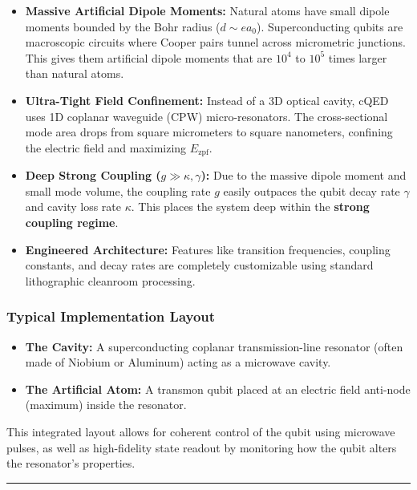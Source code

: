 \documentclass[
]{article}
\providecommand{\tightlist}{%
  \setlength{\itemsep}{0pt}\setlength{\parskip}{0pt}}
\begin{document}
\begin{itemize}
\tightlist
\item
  \textbf{Massive Artificial Dipole Moments:} Natural atoms have small
  dipole moments bounded by the Bohr radius (\(d \sim e a_0\)).
  Superconducting qubits are macroscopic circuits where Cooper pairs
  tunnel across micrometric junctions. This gives them artificial dipole
  moments that are \(10^4\) to \(10^5\) times larger than natural atoms.
\item
  \textbf{Ultra-Tight Field Confinement:} Instead of a 3D optical
  cavity, cQED uses 1D coplanar waveguide (CPW) micro-resonators. The
  cross-sectional mode area drops from square micrometers to square
  nanometers, confining the electric field and maximizing
  \(E_{\text{zpf}}\).
\item
  \textbf{Deep Strong Coupling (\(g \gg \kappa, \gamma\)):} Due to the
  massive dipole moment and small mode volume, the coupling rate \(g\)
  easily outpaces the qubit decay rate \(\gamma\) and cavity loss rate
  \(\kappa\). This places the system deep within the \textbf{strong
  coupling regime}.
\item
  \textbf{Engineered Architecture:} Features like transition
  frequencies, coupling constants, and decay rates are completely
  customizable using standard lithographic cleanroom processing.
\end{itemize}

\subsubsection{Typical Implementation
Layout}\label{typical-implementation-layout}

\begin{itemize}
\tightlist
\item
  \textbf{The Cavity:} A superconducting coplanar transmission-line
  resonator (often made of Niobium or Aluminum) acting as a microwave
  cavity.
\item
  \textbf{The Artificial Atom:} A transmon qubit placed at an electric
  field anti-node (maximum) inside the resonator.
\end{itemize}

This integrated layout allows for coherent control of the qubit using
microwave pulses, as well as high-fidelity state readout by monitoring
how the qubit alters the resonator's properties.

\begin{center}\rule{0.5\linewidth}{0.5pt}\end{center}
\end{document}
